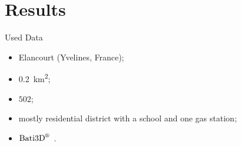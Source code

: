 \documentclass{beamer}
\begin{document}
    \section{Results}
        \begin{frame}{Used Data}
            \begin{itemize}[leftmargin=6em, font=\color{IGNDarkGreen}]
                \item[Town:]<1-> Elancourt (Yvelines, France);
                \item[Area:]<2-> \SI{0.2}{\km\squared};
                \item[Buildings:]<3-> $502$;
                \item[Type:]<4-> mostly residential district with a school and one gas station;
                \item[Algorithm:]<5-> $\text{Bati3D}^\text{\textregistered}$~.
            \end{itemize}
        \end{frame}
\end{document}

